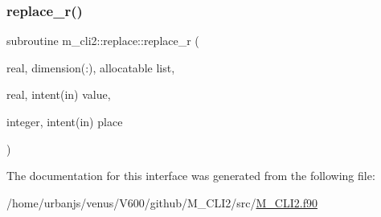 \mbox{\label{interfacem__cli2_1_1replace_adf284ee215097b8416e81532b7d4251b}} 
\subsubsection{\texorpdfstring{replace\+\_\+r()}{replace\_r()}}
{\footnotesize\ttfamily subroutine m\+\_\+cli2\+::replace\+::replace\+\_\+r (\begin{DoxyParamCaption}\item[{real, dimension(\+:), allocatable}]{list,  }\item[{real, intent(in)}]{value,  }\item[{integer, intent(in)}]{place }\end{DoxyParamCaption})\hspace{0.3cm}{\ttfamily [private]}}



The documentation for this interface was generated from the following file\+:\begin{DoxyCompactItemize}
\item 
/home/urbanjs/venus/\+V600/github/\+M\+\_\+\+C\+L\+I2/src/\mbox{\hyperlink{M__CLI2_8f90}{M\+\_\+\+C\+L\+I2.\+f90}}\end{DoxyCompactItemize}
